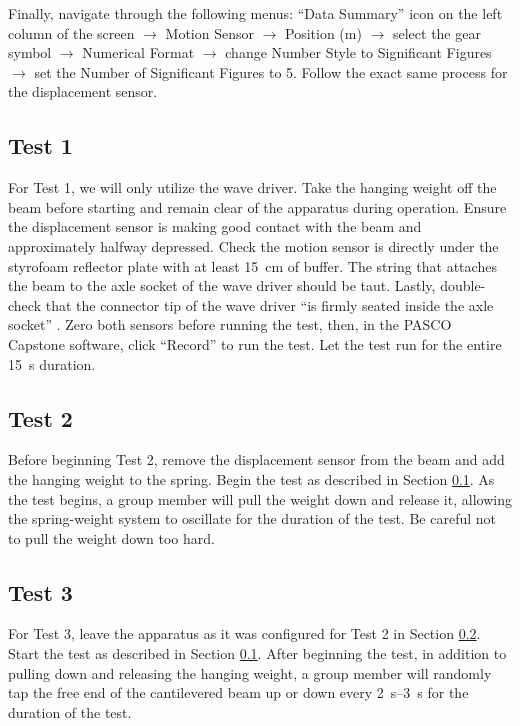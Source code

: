 \documentclass[12 pt]{report}
\begin{document}
Finally, navigate through the following menus: ``Data Summary'' icon on the left column of the screen $\rightarrow$ Motion Sensor $\rightarrow$ Position (m) $\rightarrow$ select the gear symbol $\rightarrow$ Numerical Format $\rightarrow$ change Number Style to Significant Figures $\rightarrow$ set the Number of Significant Figures to \num{5}. Follow the exact same process for the displacement sensor.

\subsection{Test 1} \label{procedures-test_1}
For Test \num{1}, we will only utilize the wave driver. Take the hanging weight off the beam before starting and remain clear of the apparatus during operation. Ensure the displacement sensor is making good contact with the beam and approximately halfway depressed. Check the motion sensor is directly under the styrofoam reflector plate with at least \qty{15}{\cm} of buffer. The string that attaches the beam to the axle socket of the wave driver should be taut. Lastly, double-check that the connector tip of the wave driver ``is firmly seated inside the axle socket'' \cite{lab_procedures}. Zero both sensors before running the test, then, in the PASCO Capstone software, click ``Record'' to run the test. Let the test run for the entire \qty{15}{\s} duration. 

\subsection{Test 2} \label{procedures-test_2}
Before beginning Test \num{2}, remove the displacement sensor from the beam and add the hanging weight to the spring. Begin the test as described in Section \ref{procedures-test_1}. As the test begins, a group member will pull the weight down and release it, allowing the spring-weight system to oscillate for the duration of the test. Be careful not to pull the weight down too hard.

\subsection{Test 3} \label{procedures-test_3}
For Test \num{3}, leave the apparatus as it was configured for Test \num{2} in Section \ref{procedures-test_2}. Start the test as described in Section \ref{procedures-test_1}. After beginning the test, in addition to pulling down and releasing the hanging weight, a group member will randomly tap the free end of the cantilevered beam up or down every \qtyrange{2}{3}{\s} for the duration of the test.
\end{document}
